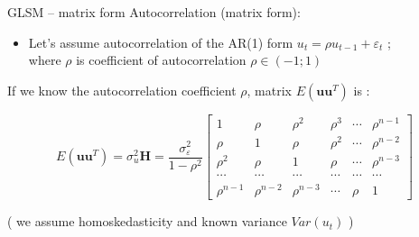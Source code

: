 \documentclass{beamer}
\begin{document}

\begin{frame}{GLSM – matrix form}
Autocorrelation (matrix form):
\begin{itemize}
\item Let's assume autocorrelation of the AR(1) form $u_t = \rho u_{t-1}+ \varepsilon_t$  ; \\ where $\rho$ is coefficient of autocorrelation $\rho \in (-1; 1)$
\end{itemize}
\vspace{0.2cm}
If we know the autocorrelation coefficient $\rho$,  matrix $E(\boldsymbol{uu}^T)$ is :

$$E(\boldsymbol{uu}^T)= \sigma^2_u\bm{H} = \frac{\sigma^2_{\varepsilon}}{1-\rho^2}
    \begin{bmatrix}
    1&  \rho & \rho^2 & \rho^3 & \cdots & \rho^{n-1}\\
    \rho &  1&  \rho & \rho^2 & \cdots & \rho^{n-2} \\ 
    \rho^2 &  \rho &  1& \rho  & \cdots & \rho^{n-3} \\ 
    \cdots & \cdots & \cdots & \cdots & \cdots & \cdots \\
     \rho^{n-1} & \rho^{n-2} & \rho^{n-3} & \cdots & \rho & 1
\end{bmatrix}$$

( we assume homoskedasticity and known variance $\textit{Var}(u_t)$ )
\end{frame}

\end{document}
